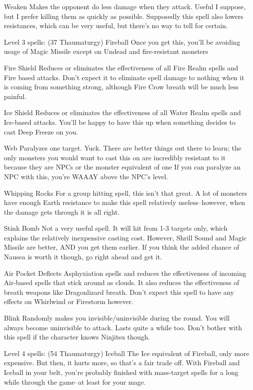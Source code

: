 \documentclass[12pt]{article}
\begin{document}
Weaken Makes the opponent do less damage when they attack. Useful I
suppose, but I prefer killing them as quickly as possible. Supposedly
this spell also lowers resistances, which can be very useful, but
there's no way to tell for certain.

Level 3 spells: (37 Thaumaturgy) Fireball Once you get this, you'll be
avoiding usage of Magic Missile except on Undead and fire-resistant
monsters

Fire Shield Reduces or eliminates the effectiveness of all Fire Realm
spells and Fire based attacks. Don't expect it to eliminate spell damage
to nothing when it is coming from something strong, although Fire Crow
breath will be much less painful.

Ice Shield Reduces or eliminates the effectiveness of all Water Realm
spells and Ice-based attacks. You'll be happy to have this up when
something decides to cast Deep Freeze on you.

Web Paralyzes one target. Yuck. There are better things out there to
learn; the only monsters you would want to cast this on are incredibly
resistant to it because they are NPCs or the monster equivalent of one
If you can paralyze an NPC with this, you're WAAAY above the NPC's
level.

Whipping Rocks For a group hitting spell, this isn't that great. A lot
of monsters have enough Earth resistance to make this spell relatively
useless--however, when the damage gets through it is all right.

Stink Bomb Not a very useful spell. It will hit from 1-3 targets only,
which explains the relatively inexpensive casting cost. However, Shrill
Sound and Magic Missile are better, AND you get them earlier. If you
think the added chance of Nausea is worth it though, go right ahead and
get it.

Air Pocket Deflects Asphyxiation spells and reduces the effectiveness of
incoming Air-based spells that stick around as clouds. It also reduces
the effectiveness of breath weapons like Dragonlizard breath. Don't
expect this spell to have any effects on Whirlwind or Firestorm however.

Blink Randomly makes you invisible/uninvisible during the round. You
will always become uninvisible to attack. Lasts quite a while too. Don't
bother with this spell if the character knows Ninjitsu though.

Level 4 spells: (54 Thaumaturgy) Iceball The Ice equivalent of Fireball,
only more expensive. But then, it hurts more, so that's a fair trade
off. With Fireball and Iceball in your belt, you're probably finished
with mass-target spells for a long while through the game--at least for
your mage.
\end{document}
